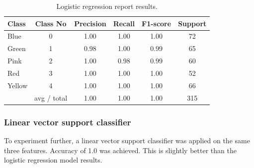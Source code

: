 \documentclass[11pt]{article}
\begin{document}
			\begin{center}
			  	\begin{table}[h]
			  	\centering
				\begin{tabular}[b]{| l | c | c | c | c | c |}
					\hline
					Class & Class No & Precision &  Recall & F1-score & Support  \\
		 			\hline
					  Blue  &  0  &    1.00   &   1.00   &   1.00    &    72 \\
			          Green &  1  &    0.98   &   1.00   &   0.99    &    65 \\
			          Pink  &  2   &    1.00   &   0.98   &   0.99    &    60 \\
			          Red  &   3   &    1.00   &   1.00   &   1.00    &    52 \\
			          Yellow & 4   &    1.00   &   1.00   &   1.00    &    66 \\
		  			\hline
					 & avg / total   &    1.00   &   1.00   &   1.00   &    315 \\
					\hline
				\end{tabular}
				\caption{Logistic regression report results.}
				\label{tbl:logistic_resuts_multi}
				\end{table}
			\end{center}
			\vspace*{-1.3cm}

			\subsubsection{Linear vector support classifier}
				To experiment further, a linear vector support classifier was applied on the same three features. Accuracy of 1.0 was achieved. This is slightly better than the logistic regression model results. 
\end{document}
